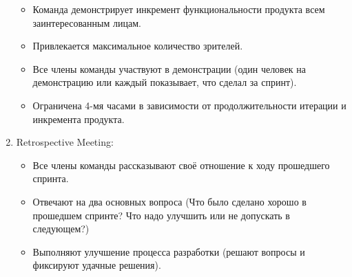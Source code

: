 \documentclass{article}
\begin{document}
\begin{enumerate}
\begin{itemize}
            \item Команда демонстрирует инкремент функциональности продукта всем заинтересованным лицам.
            \item Привлекается максимальное количество зрителей.
            \item Все члены команды участвуют в демонстрации (один человек на демонстрацию или каждый показывает, что сделал за спринт).
            \item Ограничена 4-мя часами в зависимости от продолжительности итерации и инкремента продукта.
        \end{itemize}
        \item Retrospective Meeting:
        \begin{itemize}
            \item Все члены команды рассказывают своё отношение к ходу прошедшего спринта.
            \item Отвечают на два основных вопроса (Что было сделано хорошо в прошедшем спринте? Что надо улучшить или не допускать в следующем?)
            \item Выполняют улучшение процесса разработки (решают вопросы и фиксируют удачные решения).
        \end{itemize}
    \end{enumerate}
\end{document}
